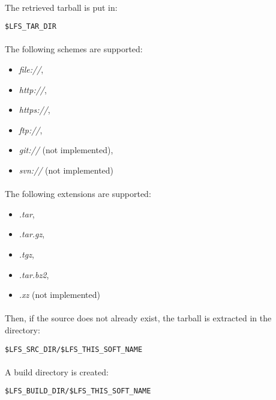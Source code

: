 \documentclass[a4paper, 11pt]{article}
\begin{document}
\paragraph{}
The retrieved tarball is put in:\\
\begin{lstlisting}[frame=tb]
$LFS_TAR_DIR
\end{lstlisting}

\paragraph{}
The following schemes are supported:
\begin{itemize}
\item \textit{file://},
\item \textit{http://},
\item \textit{https://},
\item \textit{ftp://},
\item \textit{git://} (not implemented),
\item \textit{svn://} (not implemented)
\end{itemize}

\paragraph{}
The following extensions are supported:
\begin{itemize}
\item \textit{.tar},
\item \textit{.tar.gz},
\item \textit{.tgz},
\item \textit{.tar.bz2},
\item \textit{.xz} (not implemented)
\end{itemize}

\paragraph{}
Then, if the source does not already exist, the tarball is extracted in the
directory:\\

\begin{lstlisting}[frame=tb]
$LFS_SRC_DIR/$LFS_THIS_SOFT_NAME
\end{lstlisting}

\paragraph{}
A build directory is created:\\
\begin{lstlisting}[frame=tb]
$LFS_BUILD_DIR/$LFS_THIS_SOFT_NAME
\end{lstlisting}
\end{document}
